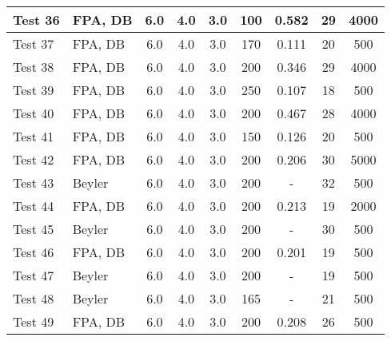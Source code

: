 \begin{table}[!h]
\begin{center}
\begin{tabular}{|l|l|c|c|c|c|c|c|c|}
Test 36    &  FPA, DB           &  6.0       &  4.0       &  3.0       &  100            &  0.582          &  29                &  4000            \\ \hline
Test 37    &  FPA, DB           &  6.0       &  4.0       &  3.0       &  170            &  0.111          &  20                &  500             \\ \hline
Test 38    &  FPA, DB           &  6.0       &  4.0       &  3.0       &  200            &  0.346          &  29                &  4000            \\ \hline
Test 39    &  FPA, DB           &  6.0       &  4.0       &  3.0       &  250            &  0.107          &  18                &  500             \\ \hline
Test 40    &  FPA, DB           &  6.0       &  4.0       &  3.0       &  200            &  0.467          &  28                &  4000            \\ \hline
Test 41    &  FPA, DB           &  6.0       &  4.0       &  3.0       &  150            &  0.126          &  20                &  500             \\ \hline
Test 42    &  FPA, DB           &  6.0       &  4.0       &  3.0       &  200            &  0.206          &  30                &  5000            \\ \hline
Test 43    &  Beyler            &  6.0       &  4.0       &  3.0       &  200            &  -              &  32                &  500             \\ \hline
Test 44    &  FPA, DB           &  6.0       &  4.0       &  3.0       &  200            &  0.213          &  19                &  2000            \\ \hline
Test 45    &  Beyler            &  6.0       &  4.0       &  3.0       &  200            &  -              &  30                &  500             \\ \hline
Test 46    &  FPA, DB           &  6.0       &  4.0       &  3.0       &  200            &  0.201          &  19                &  500             \\ \hline
Test 47    &  Beyler            &  6.0       &  4.0       &  3.0       &  200            &  -              &  19                &  500             \\ \hline
Test 48    &  Beyler            &  6.0       &  4.0       &  3.0       &  165            &  -              &  21                &  500             \\ \hline
Test 49    &  FPA, DB           &  6.0       &  4.0       &  3.0       &  200            &  0.208          &  26                &  500             \\ \hline

\end{tabular}
\end{center}
\end{table}
